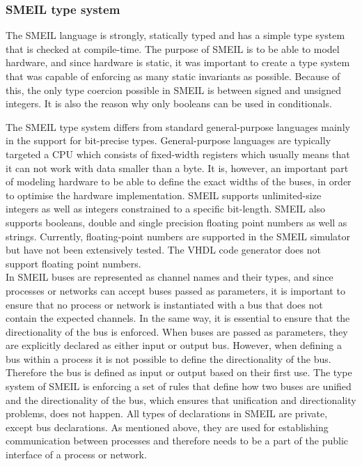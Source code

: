 \subsubsection{SMEIL type system}
The SMEIL language is strongly, statically typed and has a simple type system that is checked at compile-time. The purpose of SMEIL is to be able to model hardware, and since hardware is static, it was important to create a type system that was capable of enforcing as many static invariants as possible.
Because of this, the only type coercion possible in SMEIL is between signed and unsigned integers. It is also the reason why only booleans can be used in conditionals.

The SMEIL type system differs from standard general-purpose languages mainly in the support for bit-precise types. General-purpose languages are typically targeted a CPU which consists of fixed-width registers which usually means that it can not work with data smaller than a byte. It is, however, an important part of modeling hardware to be able to define the exact widths of the buses, in order to optimise the hardware implementation. SMEIL supports unlimited-size integers as well as integers constrained to a specific bit-length. SMEIL also supports booleans, double and single precision floating point numbers as well as strings. Currently, floating-point numbers are supported in the SMEIL simulator but have not been extensively tested. The VHDL code generator does not support floating point numbers. \\

In SMEIL buses are represented as channel names and their types, and since processes or networks can accept buses passed as parameters, it is important to ensure that no process or network is instantiated with a bus that does not contain the expected channels.
In the same way, it is essential to ensure that the directionality of the bus is enforced. When buses are passed as parameters, they are explicitly declared as either input or output bus. However, when defining a bus within a process it is not possible to define the directionality of the bus. Therefore the bus is defined as input or output based on their first use.
The type system of SMEIL is enforcing a set of rules that define how two buses are unified and the directionality of the bus, which ensures that unification and directionality problems, does not happen.
All types of declarations in SMEIL are private, except bus declarations. As mentioned above, they are used for establishing communication between processes and therefore needs to be a part of the public interface of a process or network.


